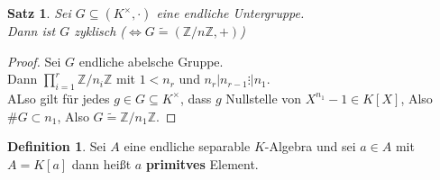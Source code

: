 \documentclass[10pt,a4paper]{article}
\newcommand{\Z}{\ensuremath{\mathbb{Z}}}
\newcommand{\isomorph}{\ensuremath{\tilde{=}}}
\newcounter{thm}[section]
\theoremstyle{definition}
\newtheorem{definition}[thm]{Definition}
\theoremstyle{plain}
\newtheorem{satz}[thm]{Satz}
\theoremstyle{remark}
\begin{document}
\begin{satz}\label{930satz}
	Sei $G\subseteq(K^\times,\cdot)$ eine endliche Untergruppe.\\
	Dann ist $G$ zyklisch ($\Leftrightarrow G\isomorph (\Z/n\Z,+)$)
\end{satz}
\begin{proof}
	Sei $G$ endliche abelsche Gruppe.\\
	Dann $\prod_{i=1}^{r}\Z/n_i\Z$ mit $1<n_r$ und $n_r|n_{r-1}\vdots|n_1$.\\
	ALso gilt für jedes $g\in G\subseteq K^\times$, dass $g$ Nullstelle von $X^{n_1}-1\in K[X]$, Also $\#G\subset n_1$, Also $G\isomorph \Z/n_1\Z$.
\end{proof}

\begin{definition}
	Sei $A$ eine endliche separable $K$-Algebra und sei $a\in A$ mit $A=K[a]$ dann heißt $a$ \textbf{primitves} Element.
\end{definition}

\addtocounter{thm}{-1}
\end{document}
